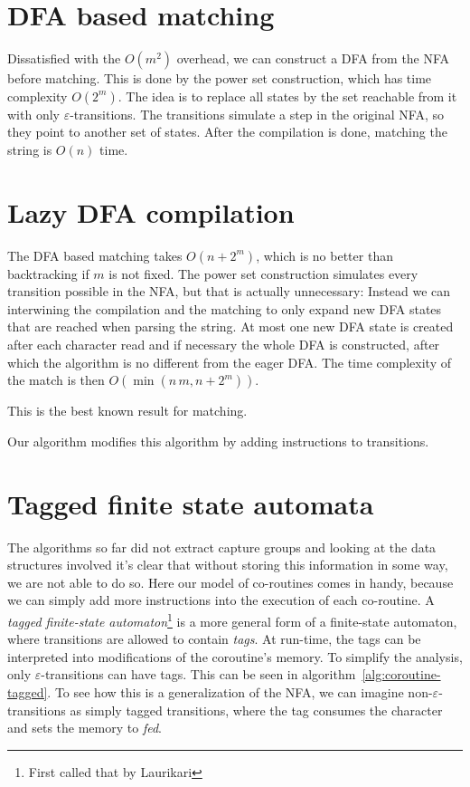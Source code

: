 \documentclass[11pt]{Thesis}
\theoremstyle{definition}
\newcommand{\seclabel}[1]{\label{sec:#1}}
\begin{document}
\section{DFA based matching}\label{sec:dfa-match}
Dissatisfied with the $O(m^2)$ overhead, we can construct a DFA from the NFA 
before matching. This is done by the power set construction\cite{Sips05a}, 
which has time complexity $O(2^m)$. The idea is to replace all states by the 
set reachable from it with only $\varepsilon$-transitions. The transitions 
simulate a step in the original NFA, so they point to another set of states.
After the compilation is done, matching the string is $O(n)$ time.

\section{Lazy DFA compilation}\label{sec:lazy-dfa-match}
The DFA based matching takes $O(n + 2^m)$, which is no better than backtracking
if $m$ is not fixed. The power set construction simulates every transition 
possible in the NFA, but that is actually unnecessary: Instead we can 
interwining the compilation and the matching to only expand new DFA states that
are reached when parsing the string. At most one new DFA state is created after
each character read and if necessary the whole DFA is constructed, after 
which the algorithm is no different from the eager DFA. The time complexity of
the match is then $O(\min(n\, m, n+2^m))$. 

This is the best known result for matching\cite{Cox07a,Cox09a,Cox10a}.

Our algorithm modifies this algorithm by adding instructions to transitions.

\section{Tagged finite state automata}\seclabel{tfsa}
The algorithms so far did not extract capture groups and looking at the data 
structures involved it's clear that without storing this information in some 
way, we are not able to do so. Here our model of co-routines comes in 
handy, because we can simply add more instructions into the execution of each 
co-routine. A \emph{tagged finite-state automaton}\footnote{First called that by
Laurikari\cite{Laur00a}} is a more general form of a finite-state automaton,
where transitions are allowed to contain \emph{tags}. At run-time, the tags
can be interpreted into modifications of the coroutine's memory. To simplify
the analysis, only $\varepsilon$-transitions can have tags. This can be seen
in algorithm~\ref{alg:coroutine-tagged}. To see how this is a generalization
of the NFA, we can imagine non-$\varepsilon$-transitions as simply tagged
transitions, where the tag consumes the character and sets the memory to
\emph{fed}.
\end{document}
